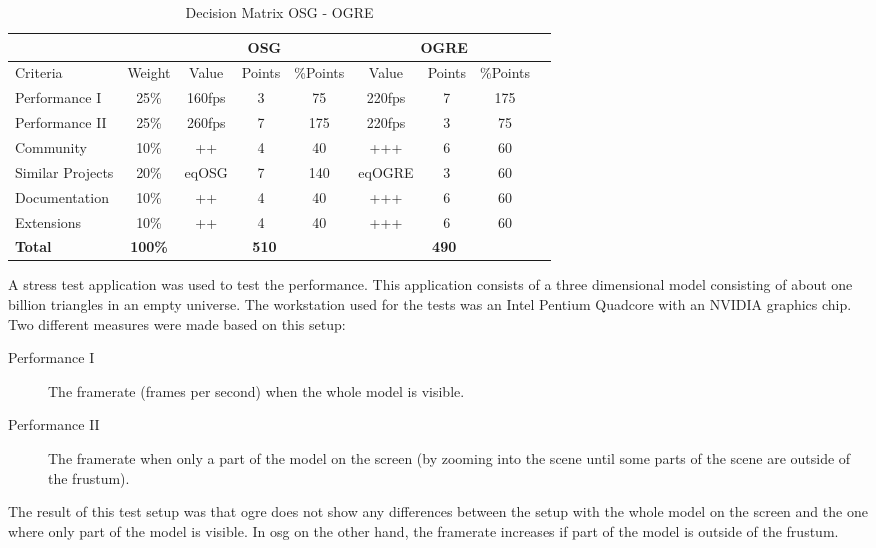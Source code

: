 \begin{table}[ht]
	\centering
	\begin{tabular}{|l|c||c|c|c||c|c|c|c|}
		\multicolumn{2}{r}{ }			&	\multicolumn{3}{c}{\bfseries OSG}	&	\multicolumn{3}{c}{\bfseries OGRE} 	\\
		\hline
		Criteria		& Weight		&	Value	& Points	& \%Points		&	Value	& Points	& \%Points		\\
		\hline
		Performance I 	& 25\%			&	160fps	& 3			& 75			&	220fps	& 7			& 175			\\
		Performance II	& 25\%			&	260fps	& 7			& 175			&	220fps	& 3			& 75			\\
		Community		& 10\%			& 	++		& 4			& 40			&	+++		& 6			& 60			\\
		Similar Projects& 20\%			& 	eqOSG	& 7			& 140			&	eqOGRE	& 3			& 60			\\
		Documentation	& 10\%			&	++		& 4			& 40			&	+++		& 6			& 60			\\
		Extensions		& 10\%			&	++		& 4			& 40			&	+++		& 6			& 60			\\
		\hline
		\hline
		\bfseries Total	&\bfseries 100\%&	\multicolumn{3}{c||}{\bfseries 510}	&	\multicolumn{3}{c|}{\bfseries 490}	\\
		\hline	
	\end{tabular}
	\caption{Decision Matrix OSG - OGRE}
	\label{tab:DecisionMatrix}
\end{table}

A stress test application was used to test the performance. This application consists of a three dimensional model consisting of about one billion triangles in an empty universe. The workstation used for the tests was an Intel Pentium Quadcore with an NVIDIA graphics chip. Two different measures were made based on this setup:
\begin{description}
	\item[Performance I] 	The framerate (frames per second) when the whole model is visible.
	\item[Performance II]	The framerate when only a part of the model on the screen (by zooming into the scene until some parts of the scene are outside of the frustum).
\end{description}
The result of this test setup was that \gls{ogre} does not show any differences between the setup with the whole model on the screen and the one where only part of the model is visible. In \gls{osg} on the other hand, the framerate increases if part of the model is outside of the frustum.


